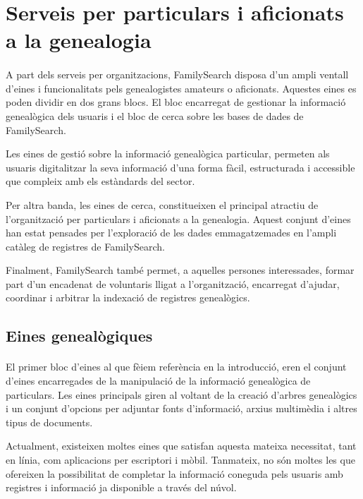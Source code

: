 \section{Serveis per particulars i aficionats a la genealogia}

    \paragraph{}
    A part dels serveis per organitzacions, FamilySearch disposa d'un ampli ventall d'eines i funcionalitats pels genealogistes amateurs o aficionats. Aquestes eines es poden dividir en dos grans blocs. El bloc encarregat de gestionar la informació genealògica dels usuaris i el bloc de cerca sobre les bases de dades de FamilySearch.

    Les eines de gestió sobre la informació genealògica particular, permeten als usuaris digitalitzar la seva informació d'una forma fàcil, estructurada i accessible que compleix amb els estàndards del sector.

    Per altra banda, les eines de cerca, constitueixen el principal atractiu de l’organització per particulars i aficionats a la genealogia. Aquest conjunt d'eines han estat pensades per l’exploració de les dades emmagatzemades en l'ampli catàleg de registres de FamilySearch.

    Finalment, FamilySearch també permet, a aquelles persones interessades, formar part d'un encadenat de voluntaris lligat a l'organització, encarregat d'ajudar, coordinar i arbitrar la indexació de registres genealògics.


    \subsection{Eines genealògiques}

    \paragraph{}
    El primer bloc d'eines al que fèiem referència en la introducció, eren el conjunt d'eines encarregades de la manipulació de la informació genealògica de particulars. Les eines principals giren al voltant de la creació d’arbres genealògics i un conjunt d'opcions per adjuntar fonts d’informació, arxius multimèdia i altres tipus de documents.

    Actualment, existeixen moltes eines que satisfan aquesta mateixa necessitat, tant en línia, com aplicacions per escriptori i mòbil. Tanmateix, no són moltes les que ofereixen la possibilitat de completar la informació coneguda pels usuaris amb re\-gis\-tres i informació ja disponible a través del núvol.

